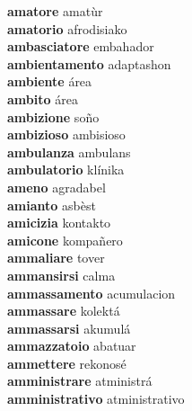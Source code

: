 \textbf{amatore } amatùr \\
\textbf{amatorio } afrodisiako \\
\textbf{ambasciatore } embahador \\
\textbf{ambientamento } adaptashon \\
\textbf{ambiente } área \\
\textbf{ambito } área \\
\textbf{ambizione } soño \\
\textbf{ambizioso } ambisioso \\
\textbf{ambulanza } ambulans \\
\textbf{ambulatorio } klínika \\
\textbf{ameno } agradabel \\
\textbf{amianto } asbèst \\
\textbf{amicizia } kontakto \\
\textbf{amicone } kompañero \\
\textbf{ammaliare } tover \\
\textbf{ammansirsi } calma \\
\textbf{ammassamento } acumulacion \\
\textbf{ammassare } kolektá \\
\textbf{ammassarsi } akumulá \\
\textbf{ammazzatoio } abatuar \\
\textbf{ammettere } rekonosé \\
\textbf{amministrare } atministrá \\
\textbf{amministrativo } atministrativo \\
